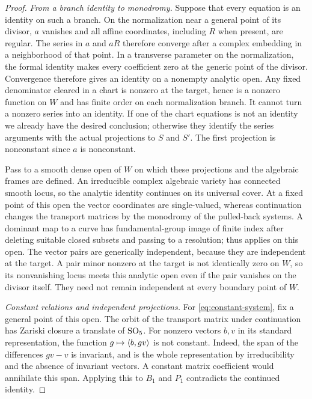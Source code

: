 \begin{proof}
\emph{From a branch identity to monodromy.}
Suppose that every equation is an identity on such a
branch.  On the normalization near a general point of its divisor, $a$
vanishes and all affine coordinates, including $R$ when present, are
regular.  The series in $a$ and $aR$ therefore converge after a complex
embedding in a neighborhood of that point.  In a transverse parameter on the normalization, the formal identity
makes every coefficient zero at the generic point of the divisor.
Convergence therefore gives an identity on a nonempty analytic open.
Any fixed denominator cleared in a chart is nonzero at the target,
hence is a nonzero function on $W$ and has finite order on each
normalization branch.  It cannot turn a nonzero series into an identity.  If one of the chart
equations is not an identity we already have the desired conclusion;
otherwise they identify the series arguments with the actual
projections to $S$ and $S'$.  The first projection is nonconstant since
$a$ is nonconstant.

Pass to a smooth dense open of $W$ on which these projections and the
algebraic frames are defined.  An irreducible complex algebraic variety
has connected smooth locus, so the analytic identity continues on its
universal cover.  At a fixed point of this open the vector coordinates
are single-valued, whereas continuation changes the transport matrices
by the monodromy of the pulled-back systems.  A dominant map to a curve
has fundamental-group image of finite index after deleting suitable
closed subsets and passing to a resolution; thus
 applies on this open.  The vector pairs are
generically independent, because they are independent at the target.
A pair minor nonzero at the target is not identically zero on $W$,
so its nonvanishing locus meets this analytic open even if the pair
vanishes on the divisor itself.
They need not remain independent at every boundary point of $W$.

\emph{Constant relations and independent projections.}
For \eqref{eq:constant-system}, fix a general point of this open.  The
orbit of the transport matrix under continuation has Zariski closure a
translate of $\operatorname{SO}_5$.  For nonzero vectors $b,v$ in its standard
representation, the function $g\mapsto\left\langle b,gv\right\rangle$ is not constant.
Indeed, the span of the differences $gv-v$ is invariant, and is the whole
representation by irreducibility and the absence of invariant vectors.
A constant matrix coefficient would annihilate this span.  Applying this
to $B_1$ and $P_1$ contradicts the continued identity.


\end{proof}
